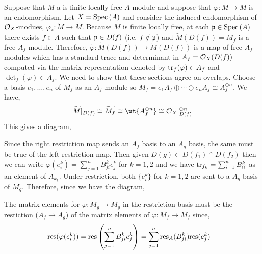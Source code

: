 \documentclass[12pt]{article}
\begin{document}
Suppose that $M$ a is finite locally free $A$-module and suppose that $\varphi : M \to M$ is an endomorphism. Let $X = \mathrm{Spec}\left( A \right)$ and consider the induced endomorphism of $\mathcal{O}_{X}$-modues, $\varphi_* : \tilde{M} \to \tilde{M}$. Because $M$ is finite locally free, at each $\mathfrak{p} \in \mathrm{Spec}\left( A \right)$ there exists $f \in A$ such that $\mathfrak{p} \in D(f)$ (i.e. $f \notin \mathfrak{p}$) and $\tilde{M}(D(f)) = M_f$ is a free $A_f$-module. Therefore, $\tilde{\varphi} : \tilde{M}(D(f)) \to \tilde{M}(D(f))$ is a map of free $A_f$-modules which has a standard trace and determinant in $A_f = \mathcal{O}_{X}(D(f))$ computed via the matrix representation denoted by $\mathrm{tr}_f(\varphi) \in A_f$ and $\det_f(\varphi) \in A_f$. We need to show that these sections agree on overlaps. Choose a basis $e_1, \dots, e_n$ of $M_f$ as an $A_f$-module so $M_f = e_1 A_f \oplus \cdots \oplus e_n A_f \cong A_f^{\oplus n}$. 
We have,
\[ \widetilde{M}|_{D(f)} \cong \widetilde{M_f} \cong \wt{A_f^{\oplus n}}  \cong \struct{X} |_{D(f)}^{\oplus n} \] 
This gives a diagram,
\begin{center}
\end{center}
Since the right restriction map sends an $A_f$ basis to an $A_g$ basis, the same must be true of the left restriction map. 
Then given $D(g) \subset D(f_1) \cap D(f_2)$ then we can write $\varphi(e_i^k) = \sum_{j = 1}^n B^k_{ji} e^k_j$ for $k = 1,2$ and we have $\mathrm{tr}_{f_k} = \sum_{i = 1}^n B^k_{ii}$ as an element of $A_{k_k}$. Under restriction, both $\{e^{k}_i \}$ for $k = 1,2$ are sent to a $A_g$-basis of $M_g$. Therefore, since we have the diagram,
\begin{center}
\end{center}
The matrix elements for $\varphi : M_g \to M_g$ in the restriction basis must be the restiction ($A_f \to A_g$) of the matrix elements of $\varphi : M_f \to M_f$ since,
\begin{align*}
\mathrm{res}(\varphi(e^k_i)) & = \mathrm{res}\left( \sum_{j = 1}^n B^k_{ji} e^k_j \right) = \sum_{j = 1}^n \mathrm{res}_A(B^k_{ji}) \mathrm{res}(e^k_j)
\end{align*}
\end{document}
